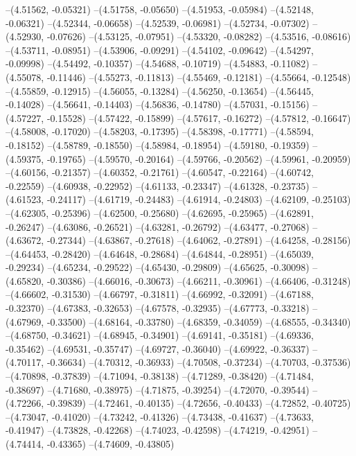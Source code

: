 --(4.51562, -0.05321)
--(4.51758, -0.05650)
--(4.51953, -0.05984)
--(4.52148, -0.06321)
--(4.52344, -0.06658)
--(4.52539, -0.06981)
--(4.52734, -0.07302)
--(4.52930, -0.07626)
--(4.53125, -0.07951)
--(4.53320, -0.08282)
--(4.53516, -0.08616)
--(4.53711, -0.08951)
--(4.53906, -0.09291)
--(4.54102, -0.09642)
--(4.54297, -0.09998)
--(4.54492, -0.10357)
--(4.54688, -0.10719)
--(4.54883, -0.11082)
--(4.55078, -0.11446)
--(4.55273, -0.11813)
--(4.55469, -0.12181)
--(4.55664, -0.12548)
--(4.55859, -0.12915)
--(4.56055, -0.13284)
--(4.56250, -0.13654)
--(4.56445, -0.14028)
--(4.56641, -0.14403)
--(4.56836, -0.14780)
--(4.57031, -0.15156)
--(4.57227, -0.15528)
--(4.57422, -0.15899)
--(4.57617, -0.16272)
--(4.57812, -0.16647)
--(4.58008, -0.17020)
--(4.58203, -0.17395)
--(4.58398, -0.17771)
--(4.58594, -0.18152)
--(4.58789, -0.18550)
--(4.58984, -0.18954)
--(4.59180, -0.19359)
--(4.59375, -0.19765)
--(4.59570, -0.20164)
--(4.59766, -0.20562)
--(4.59961, -0.20959)
--(4.60156, -0.21357)
--(4.60352, -0.21761)
--(4.60547, -0.22164)
--(4.60742, -0.22559)
--(4.60938, -0.22952)
--(4.61133, -0.23347)
--(4.61328, -0.23735)
--(4.61523, -0.24117)
--(4.61719, -0.24483)
--(4.61914, -0.24803)
--(4.62109, -0.25103)
--(4.62305, -0.25396)
--(4.62500, -0.25680)
--(4.62695, -0.25965)
--(4.62891, -0.26247)
--(4.63086, -0.26521)
--(4.63281, -0.26792)
--(4.63477, -0.27068)
--(4.63672, -0.27344)
--(4.63867, -0.27618)
--(4.64062, -0.27891)
--(4.64258, -0.28156)
--(4.64453, -0.28420)
--(4.64648, -0.28684)
--(4.64844, -0.28951)
--(4.65039, -0.29234)
--(4.65234, -0.29522)
--(4.65430, -0.29809)
--(4.65625, -0.30098)
--(4.65820, -0.30386)
--(4.66016, -0.30673)
--(4.66211, -0.30961)
--(4.66406, -0.31248)
--(4.66602, -0.31530)
--(4.66797, -0.31811)
--(4.66992, -0.32091)
--(4.67188, -0.32370)
--(4.67383, -0.32653)
--(4.67578, -0.32935)
--(4.67773, -0.33218)
--(4.67969, -0.33500)
--(4.68164, -0.33780)
--(4.68359, -0.34059)
--(4.68555, -0.34340)
--(4.68750, -0.34621)
--(4.68945, -0.34901)
--(4.69141, -0.35181)
--(4.69336, -0.35462)
--(4.69531, -0.35747)
--(4.69727, -0.36040)
--(4.69922, -0.36337)
--(4.70117, -0.36634)
--(4.70312, -0.36933)
--(4.70508, -0.37234)
--(4.70703, -0.37536)
--(4.70898, -0.37839)
--(4.71094, -0.38138)
--(4.71289, -0.38420)
--(4.71484, -0.38697)
--(4.71680, -0.38975)
--(4.71875, -0.39254)
--(4.72070, -0.39544)
--(4.72266, -0.39839)
--(4.72461, -0.40135)
--(4.72656, -0.40433)
--(4.72852, -0.40725)
--(4.73047, -0.41020)
--(4.73242, -0.41326)
--(4.73438, -0.41637)
--(4.73633, -0.41947)
--(4.73828, -0.42268)
--(4.74023, -0.42598)
--(4.74219, -0.42951)
--(4.74414, -0.43365)
--(4.74609, -0.43805)
